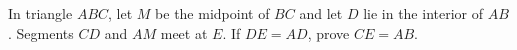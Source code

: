 In triangle $ABC$, let $M$ be the midpoint of $BC$ and let $D$ lie in the interior of $AB$. Segments $CD$ and $AM$ meet at $E$. If $DE=AD$, prove $CE=AB$.
